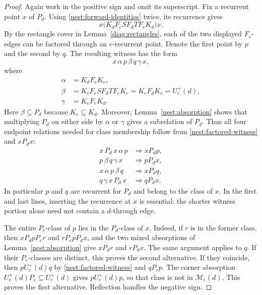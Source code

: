 \begin{proof}
Again work in the positive sign and omit its superscript.
Fix a recurrent point $x$ of $P_d$.
Using \eqref{nest:forward-identities} twice, its recurrence gives
\[
 x\bigl(K_dF_eSF_dTF_eK_d\bigr)x.
\]
By the rectangle cover in Lemma~\ref{diag:rectangles}, each of the
two displayed $F_e$-edges can be factored through an $e$-recurrent
point. Denote the first point by $p$ and the second by $q$.
The resulting witness has the form
\begin{equation}
\label{nest:factored-witness}
 x\,\alpha\,p\,\beta\,q\,\gamma\,x,
\end{equation}
where
\begin{align*}
 \alpha&=K_dF_eK_e,\\
 \beta&=K_eF_eSF_dTF_eK_e=K_eF_dK_e=U_e^+(d),\\
 \gamma&=K_eF_eK_d.
\end{align*}
Here $\beta\subseteq P_d$ because $K_e\subseteq K_d$.
Moreover, Lemma~\ref{nest:absorption} shows that multiplying $P_d$
on either side by $\alpha$ or $\gamma$ gives a subrelation of $P_d$.
Thus all four endpoint relations needed for class membership follow
from \eqref{nest:factored-witness} and $xP_dx$:
\[
\begin{array}{ll}
 x\,P_d\,x\,\alpha\,p &\Longrightarrow xP_dp,\\
 p\,\beta\,q\,\gamma\,x &\Longrightarrow pP_dx,\\
 x\,\alpha\,p\,\beta\,q &\Longrightarrow xP_dq,\\
 q\,\gamma\,x\,P_d\,x &\Longrightarrow qP_dx.
\end{array}
\]
In particular $p$ and $q$ are recurrent for $P_d$ and belong to the
class of $x$. In the first and last lines, inserting the recurrence
at $x$ is essential: the shorter witness portion alone need not
contain a $d$-through edge.

The entire $P_e$-class of $p$ lies in the $P_d$-class of $x$.
Indeed, if $r$ is in the former class, then
$xP_dpP_er$ and $rP_epP_dx$, and the two mixed absorptions of
Lemma~\ref{nest:absorption} give $xP_dr$ and $rP_dx$.
The same argument applies to $q$.
If their $P_e$-classes are distinct, this proves the second alternative.
If they coincide, then $pU_e^+(d)q$ by
\eqref{nest:factored-witness} and $qP_ep$.
The corner absorption $U_e^+(d)P_e\subseteq U_e^+(d)$ gives
$pU_e^+(d)p$, so that class is not in $\mathcal M_e(d)$.
This proves the first alternative. Reflection handles the negative sign.
\end{proof}

